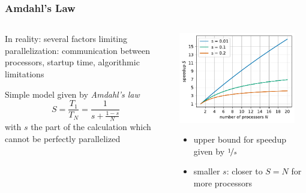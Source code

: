 \documentclass[aspectratio=169]{beamer}
\begin{document}
\begin{frame}
	\frametitle{Amdahl's Law}
	
	\begin{columns}
		\begin{column}{0.48\textwidth}
			In reality: several factors limiting parallelization: communication between processors, startup time, algorithmic limitations

			\vspace{10pt}
			\pause

			Simple model given by \emph{Amdahl's law}
			\begin{equation*}
				S = \frac{T_1}{T_N} = \frac{1}{s + \frac{1 - s}{N}}
			\end{equation*}
			with \(s\) the part of the calculation which cannot be perfectly parallelized
		\end{column}

		\begin{column}{0.48\textwidth}
			\pause
			\includegraphics[width=0.9\textwidth]{figs/amdahl.pdf}
			\begin{itemize}
				\item upper bound for speedup given by \(\nicefrac{1}{s}\)
				\item smaller \(s\): closer to \(S = N\) for more processors
			\end{itemize}
			
		\end{column}
	\end{columns}
\end{frame}
\end{document}
